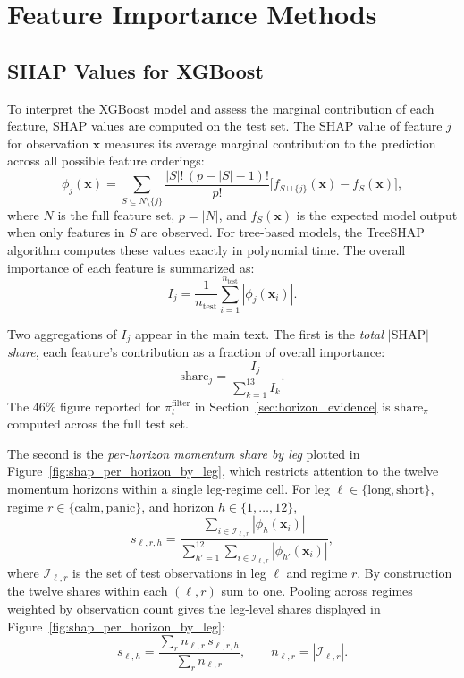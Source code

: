 \section{Feature Importance Methods}

\subsection{SHAP Values for XGBoost}\label{app:shap}

To interpret the XGBoost model and assess the marginal contribution of each feature, SHAP values \citep{Lundberg2017} are computed on the test set. The SHAP value of feature $j$ for observation $\mathbf{x}$ measures its average marginal contribution to the prediction across all possible feature orderings:
\begin{equation}
    \phi_j(\mathbf{x}) = \sum_{S \subseteq N \setminus \{j\}} \frac{|S|!\,(p - |S| - 1)!}{p!} \Big[f_{S \cup \{j\}}(\mathbf{x}) - f_S(\mathbf{x})\Big],
\end{equation}
where $N$ is the full feature set, $p = |N|$, and $f_S(\mathbf{x})$ is the expected model output when only features in $S$ are observed. For tree-based models, the TreeSHAP algorithm \citep{Lundberg2020} computes these values exactly in polynomial time. The overall importance of each feature is summarized as:
\begin{equation}
    I_j = \frac{1}{n_{\text{test}}} \sum_{i=1}^{n_{\text{test}}} |\phi_j(\mathbf{x}_i)|.
\end{equation}

Two aggregations of $I_j$ appear in the main text. The first is the \emph{total $|\text{SHAP}|$ share}, each feature's contribution as a fraction of overall importance:
\begin{equation}
    \text{share}_j = \frac{I_j}{\sum_{k=1}^{13} I_k}.
\end{equation}
The 46\% figure reported for $\pi_t^{\text{filter}}$ in Section~\ref{sec:horizon_evidence} is $\text{share}_{\pi}$ computed across the full test set.

The second is the \emph{per-horizon momentum share by leg} plotted in Figure~\ref{fig:shap_per_horizon_by_leg}, which restricts attention to the twelve momentum horizons within a single leg-regime cell. For leg $\ell \in \{\text{long}, \text{short}\}$, regime $r \in \{\text{calm}, \text{panic}\}$, and horizon $h \in \{1, \ldots, 12\}$,
\begin{equation}
    s_{\ell, r, h} = \frac{\sum_{i \in \mathcal{I}_{\ell, r}} |\phi_h(\mathbf{x}_i)|}{\sum_{h' = 1}^{12} \sum_{i \in \mathcal{I}_{\ell, r}} |\phi_{h'}(\mathbf{x}_i)|},
\end{equation}
where $\mathcal{I}_{\ell, r}$ is the set of test observations in leg $\ell$ and regime $r$. By construction the twelve shares within each $(\ell, r)$ sum to one. Pooling across regimes weighted by observation count gives the leg-level shares displayed in Figure~\ref{fig:shap_per_horizon_by_leg}:
\begin{equation}
    s_{\ell, h} = \frac{\sum_r n_{\ell, r} \, s_{\ell, r, h}}{\sum_r n_{\ell, r}}, \qquad n_{\ell, r} = |\mathcal{I}_{\ell, r}|.
\end{equation}

